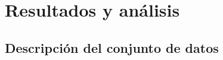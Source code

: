 \documentclass[pdfpagelabels=false, usepdftitle=false, aspectratio=169]{beamer}
\begin{document}
\section{Resultados y análisis}


\subsection{Descripción del conjunto de datos}
\end{document}
